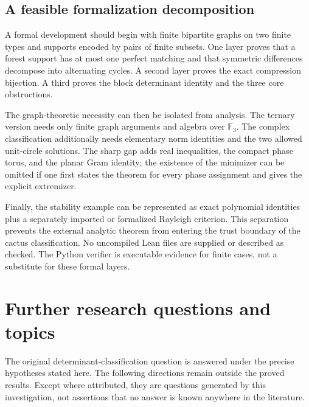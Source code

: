 \documentclass[11pt]{article}
\numberwithin{equation}{section}
\theoremstyle{definition}
\newcommand{\F}{\mathbb F}
\begin{document}
\subsection{A feasible formalization decomposition}
A formal development should begin with finite bipartite graphs on two finite types and supports encoded by pairs of finite subsets. One layer proves that a forest support has at most one perfect matching and that symmetric differences decompose into alternating cycles. A second layer proves the exact compression bijection. A third proves the block determinant identity and the three core obstructions.

The graph-theoretic necessity can then be isolated from analysis. The ternary version needs only finite graph arguments and algebra over $\F_3$. The complex classification additionally needs elementary norm identities and the two allowed unit-circle solutions. The sharp gap adds real inequalities, the compact phase torus, and the planar Gram identity; the existence of the minimizer can be omitted if one first states the theorem for every phase assignment and gives the explicit extremizer.

Finally, the stability example can be represented as exact polynomial identities plus a separately imported or formalized Rayleigh criterion. This separation prevents the external analytic theorem from entering the trust boundary of the cactus classification. No uncompiled Lean files are supplied or described as checked. The Python verifier is executable evidence for finite cases, not a substitute for these formal layers.

\section{Further research questions and topics}
\label{cac:sec:questions}

The original determinant-classification question is answered under the precise hypotheses stated here. The following directions remain outside the proved results. Except where attributed, they are questions generated by this investigation, not assertions that no answer is known anywhere in the literature.
\end{document}
